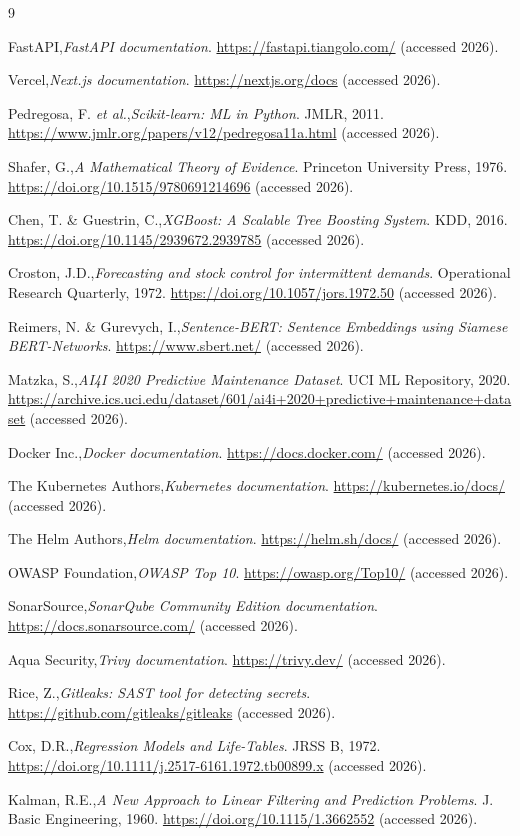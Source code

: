 \small
\begin{thebibliography}{9}
\setlength{\itemsep}{0pt}
\setlength{\parsep}{0pt}
\setlength{\parskip}{0pt}

FastAPI,\emph{FastAPI documentation}. \url{https://fastapi.tiangolo.com/} (accessed 2026).

Vercel,\emph{Next.js documentation}. \url{https://nextjs.org/docs} (accessed 2026).

Pedregosa, F. \emph{et al.},\emph{Scikit-learn: ML in Python}. JMLR, 2011. \url{https://www.jmlr.org/papers/v12/pedregosa11a.html} (accessed 2026).

Shafer, G.,\emph{A Mathematical Theory of Evidence}. Princeton University Press, 1976. \url{https://doi.org/10.1515/9780691214696} (accessed 2026).

Chen, T. \& Guestrin, C.,\emph{XGBoost: A Scalable Tree Boosting System}. KDD, 2016. \url{https://doi.org/10.1145/2939672.2939785} (accessed 2026).

Croston, J.D.,\emph{Forecasting and stock control for intermittent demands}. Operational Research Quarterly, 1972. \url{https://doi.org/10.1057/jors.1972.50} (accessed 2026).

Reimers, N. \& Gurevych, I.,\emph{Sentence-BERT: Sentence Embeddings using Siamese BERT-Networks}. \url{https://www.sbert.net/} (accessed 2026).

Matzka, S.,\emph{AI4I 2020 Predictive Maintenance Dataset}. UCI ML Repository, 2020. \url{https://archive.ics.uci.edu/dataset/601/ai4i+2020+predictive+maintenance+dataset} (accessed 2026).

Docker Inc.,\emph{Docker documentation}. \url{https://docs.docker.com/} (accessed 2026).

The Kubernetes Authors,\emph{Kubernetes documentation}. \url{https://kubernetes.io/docs/} (accessed 2026).

The Helm Authors,\emph{Helm documentation}. \url{https://helm.sh/docs/} (accessed 2026).

OWASP Foundation,\emph{OWASP Top 10}. \url{https://owasp.org/Top10/} (accessed 2026).

SonarSource,\emph{SonarQube Community Edition documentation}. \url{https://docs.sonarsource.com/} (accessed 2026).

Aqua Security,\emph{Trivy documentation}. \url{https://trivy.dev/} (accessed 2026).

Rice, Z.,\emph{Gitleaks: SAST tool for detecting secrets}. \url{https://github.com/gitleaks/gitleaks} (accessed 2026).

Cox, D.R.,\emph{Regression Models and Life-Tables}. JRSS B, 1972. \url{https://doi.org/10.1111/j.2517-6161.1972.tb00899.x} (accessed 2026).

Kalman, R.E.,\emph{A New Approach to Linear Filtering and Prediction Problems}. J. Basic Engineering, 1960. \url{https://doi.org/10.1115/1.3662552} (accessed 2026).

\end{thebibliography}
